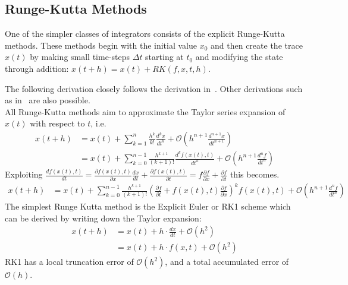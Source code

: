 \subsection*{Runge-Kutta Methods}
One of the simpler classes of integrators consists of the explicit Runge-Kutta methods.
These methods begin with the initial value $x_0$ and then create the trace $x(t)$ by making small time-steps $\Delta t$ starting at $t_0$ and modifying the state through addition: $x(t+h) = x(t) + RK(f,x,t,h)$.

The following derivation closely follows the derivation in~\cite{lyu2016plasma}.
Other derivations such as in~\cite{suli2003introduction} are also possible.
\\

\noindent
All Runge-Kutta methods aim to approximate the Taylor series expansion of $x(t)$ with respect to $t$, i.e.
\begin{align*}
x(t+h) &= x(t) + \sum_{k=1}^{n}\frac{h^k}{k!}\frac{d^kx}{dt^k} + \mathcal{O} \left(h^{n+1}\frac{d^{n+1}x}{dt^{n+1}}\right)\\
&= x(t)+ \sum_{k=0}^{n-1}\frac{h^{k+1}}{(k+1)!}\frac{d^kf(x(t),t)}{dt^k} + \mathcal{O}\left(h^{n+1}\frac{d^{n}f}{dt^{n}}\right)
\end{align*}
Exploiting $\frac{df(x(t),t)}{dt} 
= \frac{\partial f(x(t),t)}{\partial x}\frac{dx}{dt}+\frac{\partial f(x(t),t)}{\partial t} 
= f\frac{\partial f}{\partial x}+\frac{\partial f}{\partial t}$
this becomes.
\begin{align*}
x(t+h) &= x(t)+ \sum_{k=0}^{n-1}\frac{h^{k+1}}{(k+1)!}\left(\frac{\partial f}{\partial t} + f(x(t),t)\frac{\partial f}{\partial x}\right)^kf(x(t),t) + \mathcal{O}\left(h^{n+1}\frac{d^{n}f}{dt^{n}}\right)
\end{align*}
The simplest Runge Kutta method is the Explicit Euler or RK1 scheme which can be derived by writing down the Taylor expansion:
\begin{align*}
x(t+h) &= x(t) + h \cdot \frac{dx}{dt} + \mathcal{O}(h ^2)\\
&= x(t) + h \cdot f(x,t) + \mathcal{O}(h ^2)
\end{align*}
RK1 has a local truncation error of $\mathcal{O}(h^2)$, and a total accumulated error of $\mathcal{O}(h)$.
\\


